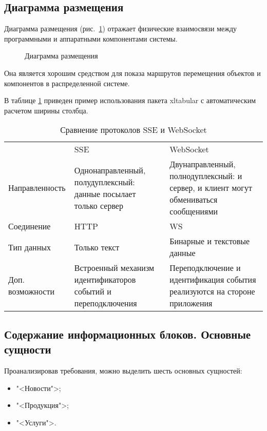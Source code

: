 \subsection{Диаграмма размещения}

Диаграмма размещения (рис.~\ref{place:image}) отражает физические взаимосвязи между программными и аппаратными компонентами системы.

\begin{figure}[h]
\caption{Диаграмма размещения}
\label{place:image}
\end{figure}

Она является хорошим средством для показа маршрутов перемещения объектов и компонентов в распределенной системе.

В таблице \ref{ssevsws:table} приведен пример использования пакета xltabular с автоматическим расчетом ширины столбца.

\begin{table}[h]
	\caption{Сравнение протоколов SSE и WebSocket}
        \label{ssevsws:table}
\begin{tabular}{|p{4cm}|p{5cm}|p{5cm}|}
\hline
	  & SSE & WebSocket \\ 
	Направленность & 
	Однонаправленный, полудуплексный: данные посылает только сервер & 
	Двунаправленный, полнодуплексный: и сервер, и клиент могут обмениваться сообщениями \\ \hline 
	Соединение  & HTTP & WS \\ \hline 
	Тип данных & Только текст & Бинарные и текстовые данные \\ \hline 
	Доп. возможности & Встроенный механизм идентификаторов событий и переподключения & Переподключение и идентификация события реализуются на стороне приложения
\end{tabular}
\end{table}

\subsection{Содержание информационных блоков. Основные сущности}

Проанализировав требования, можно выделить шесть основных сущностей:
\begin{itemize}
\item "<Новости">;
\item "<Продукция">;
\item "<Услуги">.
\end{itemize}

